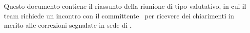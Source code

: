 Questo documento contiene il riassunto della riunione di tipo valutativo, in cui il team richiede un incontro con il committente \RC\ per ricevere dei chiarimenti in merito alle correzioni segnalate in sede di \RP.
